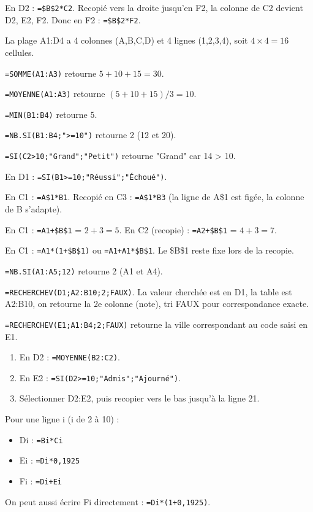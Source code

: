 En D2 : \texttt{=\$B\$2*C2}. Recopié vers la droite jusqu'en F2, la colonne de C2 devient D2, E2, F2. Donc en F2 : \texttt{=\$B\$2*F2}.

La plage A1:D4 a 4 colonnes (A,B,C,D) et 4 lignes (1,2,3,4), soit $4 \times 4 = 16$ cellules.

\texttt{=SOMME(A1:A3)} retourne $5+10+15 = 30$.

\texttt{=MOYENNE(A1:A3)} retourne $(5+10+15)/3 = 10$.

\texttt{=MIN(B1:B4)} retourne 5.

\texttt{=NB.SI(B1:B4;">=10")} retourne 2 (12 et 20).

\texttt{=SI(C2>10;"Grand";"Petit")} retourne "Grand" car 14 > 10.

En D1 : \texttt{=SI(B1>=10;"Réussi";"Échoué")}.

En C1 : \texttt{=A\$1*B1}. Recopié en C3 : \texttt{=A\$1*B3} (la ligne de A\$1 est figée, la colonne de B s'adapte).

En C1 : \texttt{=A1+\$B\$1} = $2+3=5$. En C2 (recopie) : \texttt{=A2+\$B\$1} = $4+3=7$.

En C1 : \texttt{=A1*(1+\$B\$1)} ou \texttt{=A1+A1*\$B\$1}. Le \$B\$1 reste fixe lors de la recopie.

\texttt{=NB.SI(A1:A5;12)} retourne 2 (A1 et A4).

\texttt{=RECHERCHEV(D1;A2:B10;2;FAUX)}. La valeur cherchée est en D1, la table est A2:B10, on retourne la 2e colonne (note), tri FAUX pour correspondance exacte.

\texttt{=RECHERCHEV(E1;A1:B4;2;FAUX)} retourne la ville correspondant au code saisi en E1.

\begin{enumerate}
    \item En D2 : \texttt{=MOYENNE(B2:C2)}.
    \item En E2 : \texttt{=SI(D2>=10;"Admis";"Ajourné")}.
    \item Sélectionner D2:E2, puis recopier vers le bas jusqu'à la ligne 21.
\end{enumerate}

Pour une ligne i (i de 2 à 10) :
\begin{itemize}
    \item Di : \texttt{=Bi*Ci}
    \item Ei : \texttt{=Di*0,1925}
    \item Fi : \texttt{=Di+Ei}
\end{itemize}
On peut aussi écrire Fi directement : \texttt{=Di*(1+0,1925)}.


